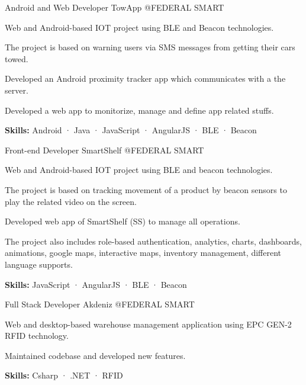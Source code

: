 \begin{cventries}
  \cventry
    {Android and Web Developer} %
    {TowApp} %
    {@FEDERAL SMART} %
    {}
    {
      \begin{cvitems} %
        \item {Web and Android-based IOT project using BLE and Beacon technologies.}
        \item {The project is based on warning users via SMS messages from getting their cars towed.}
        \item {Developed an Android proximity tracker app which communicates with a the server.}
        \item {Developed a web app to monitorize, manage and define app related stuffs.}
        \item {\textbf {Skills:} Android · Java · JavaScript · AngularJS · BLE · Beacon}
      \end{cvitems}
    }

  \cventry
    {Front-end Developer} %
    {SmartShelf} %
    {@FEDERAL SMART} %
    {}
    {
      \begin{cvitems} %
        \item {Web and Android-based IOT project using BLE and beacon technologies.}
        \item {The project is based on tracking movement of a product by beacon sensors to play the related video on the screen.}
        \item {Developed web app of SmartShelf (SS) to manage all operations.}
        \item {The project also includes role-based authentication, analytics, charts, dashboards, animations, google maps, interactive maps, inventory management, different language supports.}
        \item {\textbf {Skills:} JavaScript · AngularJS · BLE · Beacon}
      \end{cvitems}
    }

  \cventry
    {Full Stack Developer} %
    {Akdeniz} %
    {@FEDERAL SMART} %
    {}
    {
      \begin{cvitems} %
        \item {Web and desktop-based warehouse management application using EPC GEN-2 RFID technology.}
        \item {Maintained codebase and developed new features.}
        \item {\textbf {Skills:} Csharp · .NET · RFID}
      \end{cvitems}
    }


\end{cventries}
